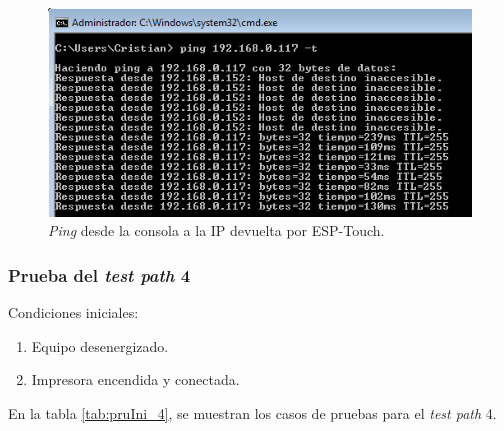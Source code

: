 \begin{figure}[htpb]
	\centering
	\includegraphics[scale=0.8]{./Figures/ping.png}
	\caption{\textit{Ping} desde la consola a la IP devuelta por ESP-Touch.}
	\label{fig:pruIni_3_ESPT_2}
\end{figure}

\subsubsection{Prueba del \textit{test path} 4}
\label{subsubsec:pruIni_4}

Condiciones iniciales: 

\begin{enumerate}
	\item Equipo desenergizado.
	\item Impresora encendida y conectada.
\end{enumerate}


En la tabla \ref{tab:pruIni_4}, se muestran los casos de pruebas para el \textit{test path} 4.

